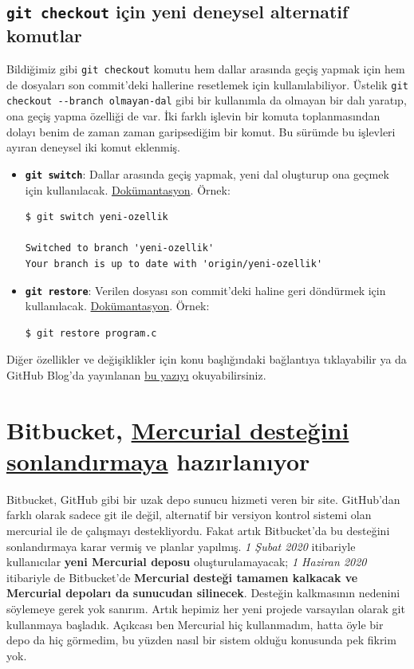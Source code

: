 \documentclass[11pt]{article}
\begin{document}
\subsection{\texttt{git checkout} için yeni deneysel alternatif komutlar}
\label{sec:org27900a9}
Bildiğimiz gibi \texttt{git checkout} komutu hem dallar arasında geçiş yapmak için
hem de dosyaları son commit'deki hallerine resetlemek için kullanılabiliyor.
Üstelik \texttt{git checkout -{}-branch olmayan-dal} gibi bir kullanımla da olmayan
bir dalı yaratıp, ona geçiş yapma özelliği de var. İki farklı işlevin bir
komuta toplanmasından dolayı benim de zaman zaman garipsediğim bir komut. Bu
sürümde bu işlevleri ayıran deneysel iki komut eklenmiş.

\begin{itemize}
\item \textbf{\texttt{git switch}}: Dallar arasında geçiş yapmak, yeni dal oluşturup ona geçmek
için kullanılacak. \href{https://git-scm.com/docs/git-switch/2.23.0}{Dokümantasyon}. Örnek:
\begin{verbatim}
$ git switch yeni-ozellik

Switched to branch 'yeni-ozellik'
Your branch is up to date with 'origin/yeni-ozellik'
\end{verbatim}
\item \textbf{\texttt{git restore}}: Verilen dosyası son commit'deki haline geri döndürmek için
kullanılacak. \href{https://git-scm.com/docs/git-restore/2.23.0}{Dokümantasyon}. Örnek:
\begin{verbatim}
$ git restore program.c
\end{verbatim}
\end{itemize}

Diğer özellikler ve değişiklikler için konu başlığındaki bağlantıya
tıklayabilir ya da GitHub Blog'da yayınlanan \href{https://github.blog/2019-08-16-highlights-from-git-2-23/}{bu yazıyı} okuyabilirsiniz.
\section{Bitbucket, \href{https://bitbucket.org/blog/sunsetting-mercurial-support-in-bitbucket}{Mercurial desteğini sonlandırmaya} hazırlanıyor}
\label{sec:orgebb1745}
Bitbucket, GitHub gibi bir uzak depo sunucu hizmeti veren bir site. GitHub'dan
farklı olarak sadece git ile değil, alternatif bir versiyon kontrol sistemi
olan mercurial ile de çalışmayı destekliyordu. Fakat artık Bitbucket'da bu
desteğini sonlandırmaya karar vermiş ve planlar yapılmış. \emph{1 Şubat 2020}
itibariyle kullanıcılar \textbf{yeni Mercurial deposu} oluşturulamayacak; \emph{1 Haziran
2020} itibariyle de Bitbucket'de \textbf{Mercurial desteği tamamen kalkacak ve
Mercurial depoları da sunucudan silinecek}. Desteğin kalkmasının nedenini
söylemeye gerek yok sanırım. Artık hepimiz her yeni projede varsayılan olarak
git kullanmaya başladık. Açıkcası ben Mercurial hiç kullanmadım, hatta öyle
bir depo da hiç görmedim, bu yüzden nasıl bir sistem olduğu konusunda pek
fikrim yok.
\end{document}
